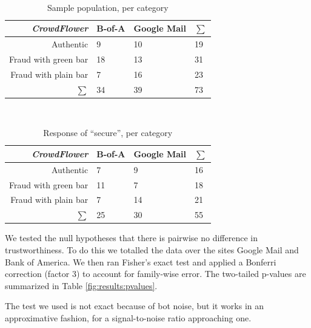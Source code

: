 \documentclass[twoside,letterpaper]{soups}
\begin{document}
\begin{table}
\centering
\caption{Sample population, per category}
\mbox{}\\
\begin{tabular}{|r|l|l|l|}
\hline
\emph{CrowdFlower}   & B-of-A   & Google Mail   & $\sum$ \\
\hline
Authentic            & 9        & 10            & 19 \\
\hline
Fraud with green bar & 18       & 13            & 31 \\
\hline
Fraud with plain bar & 7        & 16            & 23 \\
\hline
$\sum$               & 34       & 39            & 73 \\
\hline
\end{tabular}
\label{fig:results-cf:population}
\end{table}

\begin{table}
\centering
\caption{Response of ``secure'', per category}
\mbox{}\\
\begin{tabular}{|r|l|l|l|}
\hline
\emph{CrowdFlower}   & B-of-A   & Google Mail   & $\sum$ \\
\hline
Authentic            & 7        & 9             & 16 \\
\hline
Fraud with green bar & 11       & 7             & 18 \\
\hline
Fraud with plain bar & 7        & 14            & 21 \\
\hline
$\sum$               & 25       & 30            & 55 \\
\hline
\end{tabular}
\label{fig:results-cf:trusters}
\end{table}


We tested the null hypotheses that there is pairwise no difference in trustworthiness. To do this we totalled the data over the sites Google Mail and Bank of America. We then ran Fisher's exact test and applied a Bonferri correction (factor 3) to account for family-wise error. The two-tailed p-values are summarized in Table \ref{fig:results:pvalues}.

The test we used is not exact because of bot noise, but it works in an approximative fashion,
for a signal-to-noise ratio approaching one.
\end{document}
